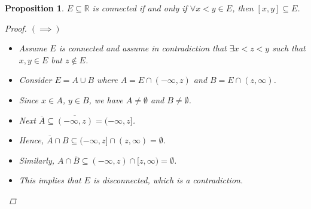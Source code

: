 \documentclass[10pt]{article}
\newcommand{\R}{\mathbb{R}}
\newtheorem{proposition}[theorem]{Proposition}
\theoremstyle{definition}
\theoremstyle{remark}
\begin{document}
\begin{proposition}
    $E \subseteq \R$ is connected if and only if $\forall x < y \in E$, then $[x, y] \subseteq E$.
    \begin{proof}
        $(\implies)$
        \begin{itemize}
            \item Assume $E$ is connected and assume in contradiction that $\exists x < z < y$ such that $x, y \in E$ but $z \not\in E$. 
            \item Consider $E = A \cup B$ where $A = E \cap (-\infty, z)$ and $B = E \cap (z, \infty)$.
            \item Since $x \in A$, $y \in B$, we have $A \neq \emptyset$ and $B \neq \emptyset$. 
            \item
        Next $\overline{A} \subseteq \overline{(-\infty, z)} = (-\infty, z]$.
            \item
        Hence, $\overline{A} \cap B \subseteq (-\infty, z] \cap (z, \infty) = \emptyset$.
            \item
        Similarly, $A \cap \overline{B} \subseteq (-\infty, z) \cap [z, \infty) = \emptyset$.
        \item  This implies that $E$ is disconnected, which is a contradiction.
        \end{itemize}


\end{proof}
\end{proposition}
\end{document}
